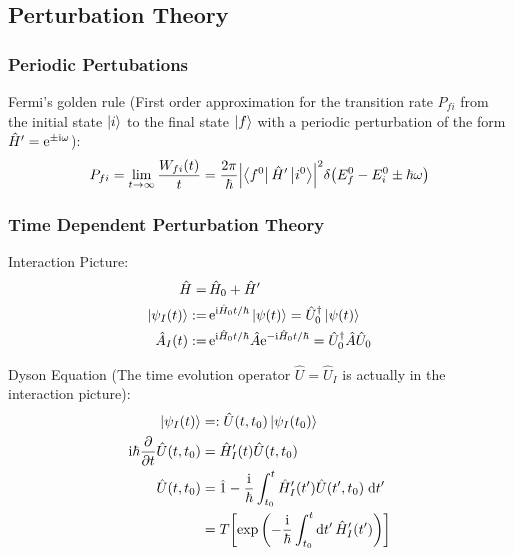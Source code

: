 	\subsection{Perturbation Theory}
		\subsubsection{Periodic Pertubations}
			\noindent
			Fermi's golden rule (First order approximation for the transition rate $P_{fi}$ from the initial state $\Ket{i}$ to the final state $\Ket{f}$ with a periodic perturbation of the form $\hat{H}' = \mathrm{e}^{\pm\mathrm{i}\omega}$):
			\begin{equation}
				P_{fi} = \lim_{t \to \infty} \frac{W_{fi}(t)}{t} = \frac{2\pi}{\hbar} \abs{\Bra{f^0}\hat{H}'\Ket{i^0}}^2 \delta\qty(E_f^0 - E_i^0 \pm \hbar\omega)
			\end{equation}

		\subsubsection{Time Dependent Perturbation Theory}
			Interaction Picture:
			\begin{equation}
				\begin{aligned}
					\hat{H} =&\, \hat{H}_0 + \hat{H}' \\
					\Ket{\psi_I(t)} :=&\, \mathrm{e}^{\mathrm{i} \hat{H}_0 t / \hbar} \Ket{\psi(t)}
					= \hat{U}_0^\dagger \Ket{\psi(t)} \\
					\Hat{A}_I(t) :=&\, \mathrm{e}^{\mathrm{i} \hat{H}_0 t / \hbar} \hat{A} \mathrm{e}^{-\mathrm{i} \hat{H}_0 t / \hbar}
					= \hat{U}_0^\dagger \hat{A} \hat{U}_0
				\end{aligned}
			\end{equation}

			\noindent
			Dyson Equation (The time evolution operator $\hat{U} = \hat{U}_I$ is actually in the interaction picture):
			\begin{equation}
				\begin{aligned}
					\Ket{\psi_I(t)} &=: \hat{U}(t,t_0) \Ket{\psi_I(t_0)} \\
					\mathrm{i} \hbar \pdv{t} \hat{U}(t,t_0) &= \hat{H}_I'(t) \hat{U}(t,t_0) \\
					\hat{U}(t,t_0) &= \hat{1} - \frac{\mathrm{i}}{\hbar} \int_{t_0}^{t} \hat{H}'_I(t') \hat{U}(t',t_0) \;\dd t' \\
					&= T \qty[\exp\qty(-\frac{\mathrm{i}}{\hbar}\int_{t_0}^{t}\dd t'\,\hat{H}'_I(t'))]
				\end{aligned}
			\end{equation}

